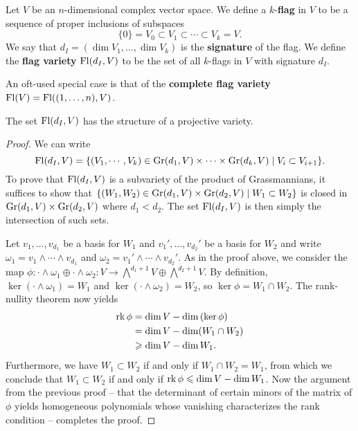 \begin{definition}
    Let $V$ be an $n$-dimensional complex vector space. We define a $k$-\textbf{flag}
    in $V$ to be a sequence of proper inclusions of subspaces
    \[\{0\}=V_0 \subset V_1 \subset \cdots \subset V_k=V.\]
    We say that $d_I=(\dim V_1,\ldots,\dim V_k)$ is the \textbf{signature} of the flag.
    We define the \textbf{flag variety} $\operatorname{Fl}(d_I,V)$ to be the set of all $k$-flags in $V$ with signature $d_I$.
\end{definition}

\begin{remark}
    An oft-used special case is that of the \textbf{complete flag variety} $\operatorname{Fl}(V)=\operatorname{Fl}( (1,\ldots,n), V)$.
\end{remark}

\begin{proposition}
    The set $\operatorname{Fl}(d_I,V)$ has the structure of a projective variety.
\end{proposition}
\begin{proof}
    We can write
    \[\operatorname{Fl}(d_I,V)=\{(V_1, \cdots,V_k)\in\operatorname{Gr}(d_1,V)\times\cdots\times\operatorname{Gr}(d_k,V) \mid V_{i}\subset V_{i+1}\}.\]
    To prove that $\operatorname{Fl}(d_I,V)$ is a subvariety of the product of Grassmannians,
    it suffices to show that $\{(W_1,W_2)\in\operatorname{Gr}(d_1,V)\times\operatorname{Gr}(d_2,V) \mid W_1\subset W_2\}$ is closed
    in $\operatorname{Gr}(d_1,V)\times\operatorname{Gr}(d_2,V)$ where $d_1<d_2$. The set $\operatorname{Fl}(d_I,V)$ is then simply the intersection
    of such sets.
    
    Let $v_1,\ldots, v_{d_1}$ be a basis for $W_1$
    and $v_1',\ldots, v_{d_2}'$ be a basis for $W_2$ and write $\omega_1=v_1\wedge\cdots\wedge v_{d_1}$
    and $\omega_2=v_1'\wedge\cdots\wedge v_{d_2}'$. As in the proof above, we consider the map
    $\phi:\cdot\wedge\omega_1\oplus\cdot\wedge\omega_2:V\to \bigwedge^{d_1+1}V\oplus\bigwedge^{d_2+1}V$.
    By definition, $\ker(\cdot\wedge\omega_1)=W_1$ and $\ker(\cdot\wedge\omega_2)=W_2$, so
    $\ker\phi=W_1\cap W_2$. The rank-nullity theorem now yields
    \begin{align*}
        \operatorname{rk}\phi &= \dim V - \dim\left( \ker\phi \right)\\
        &= \dim V - \dim(W_1\cap W_2)\\
        &\geqslant \dim V - \dim W_1.
    \end{align*}
    Furthermore, we have $W_1\subset W_2$ if and only if $W_1\cap W_2=W_1$, from which we conclude that
    $W_1\subset W_2$ if and only if $\operatorname{rk}\phi\leqslant\dim V-\dim W_1$. Now the argument
    from the previous proof -- that the determinant of certain minors of the matrix of $\phi$ yields
    homogeneous polynomials whose vanishing characterizes the rank condition -- completes
    the proof.
\end{proof}

